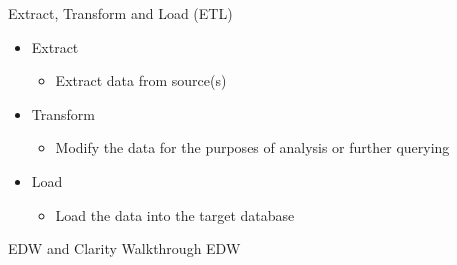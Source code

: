 \documentclass[10pt, xcolor=table]{beamer}
\begin{document}


\begin{frame}{Extract, Transform and Load (ETL)}
	\begin{itemize}
		\item Extract
		\begin{itemize}
			\item Extract data from source(s)
		\end{itemize}
		\item Transform
		\begin{itemize}
			\item Modify the data for the purposes of analysis or further querying
		\end{itemize}
		\item Load
		\begin{itemize}
			\item Load the data into the target database
		\end{itemize}
	\end{itemize}
\end{frame}


\note{
\scriptsize

}

\begin{frame}{EDW and Clarity}
Walkthrough EDW
\end{frame}
\end{document}
